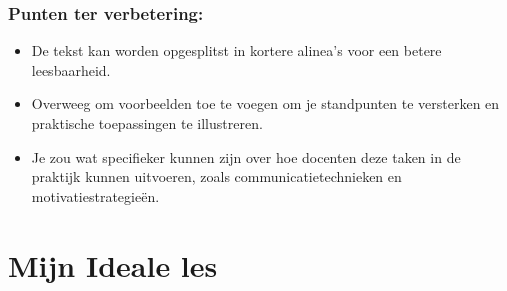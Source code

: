 \documentclass{article}
\begin{document}
                \subsubsection{Punten ter verbetering:}
                \begin{itemize}
                    \item De tekst kan worden opgesplitst in kortere alinea's voor een betere leesbaarheid.
                    \item Overweeg om voorbeelden toe te voegen om je standpunten te versterken en praktische toepassingen te illustreren.
                    \item Je zou wat specifieker kunnen zijn over hoe docenten deze taken in de praktijk kunnen uitvoeren, zoals communicatietechnieken en motivatiestrategieën.
                \end{itemize}
    
    \newpage
        
    \section{Mijn Ideale les}
\end{document}
